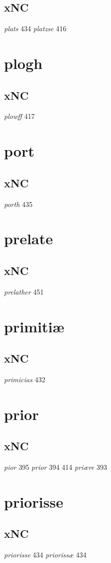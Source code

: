 \documentclass[a4paper,twocolumn]{article}
\begin{document}
\subsection{xNC}
\label{sec:org9a51077}
\emph{plats} 434 \emph{platzse} 416 
\section{plogh}
\label{sec:orgbb1dd46}
\subsection{xNC}
\label{sec:orgca7d381}
\emph{plowff} 417 
\section{port}
\label{sec:org4013e0a}
\subsection{xNC}
\label{sec:orge7380c3}
\emph{porth} 435 
\section{prelate}
\label{sec:org1763687}
\subsection{xNC}
\label{sec:orgbc122fe}
\emph{prelather} 451 
\section{primitiæ}
\label{sec:org9949d35}
\subsection{xNC}
\label{sec:org2c56280}
\emph{primicias} 432 
\section{prior}
\label{sec:org3342d3e}
\subsection{xNC}
\label{sec:orge80ddc7}
\emph{pior} 395 \emph{prior} 394 414 \emph{priære} 393 
\section{priorisse}
\label{sec:org12308c1}
\subsection{xNC}
\label{sec:orgc70b169}
\emph{priorisse} 434 \emph{priorissæ} 434 
\end{document}
